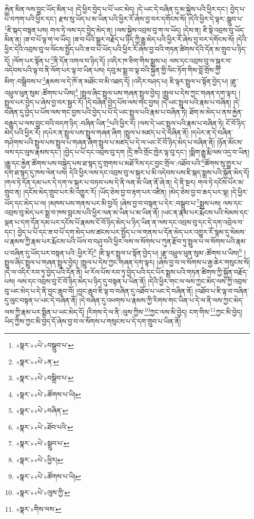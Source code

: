 རྐྱེན་མིན་ལས་བྱུང་ཡོད་མིན་པ། །དེ་ཕྱིར་བྱེད་པ་པོ་ཡང་མེད། །དེ་ཡང་དེ་བཞིན་དུ་མ་སྐྱེས་པའི་ཕྱིར་དང་། བྱེད་པ་པོ་བཀག་པའི་ཕྱིར་དང་། རྫས་སུ་ཡོད་པ་མ་ཡིན་པའི་ཕྱིར་རོ་ཞེས་བྱ་བར་དགོངས་སོ། །དེའི་ཕྱིར་དེ་ལྟར་:སྒྲུབ་པ་\footnote{«སྣར་»«པེ་»བསྒྲུབ་པ་}ཇི་སྐད་བསྟན་པས། གལ་ཏེ་ལས་དང་བྱེད་མེད་ན། །ལས་སྐྱེས་འབྲས་བུ་ག་ལ་ཡོད། །དེས་ན། ཇི་སྟེ་འབྲས་བུ་ཡོད་མིན་ན། །ཟ་བ་པོ་ལྟ་ག་ལ་ཡོད། །ཟ་བ་པོའི་སྒྲར་བརྗོད་པ་ཉིད་ཀྱི་རྒྱུ་མེད་པའི་ཕྱིར་རོ་ཞེས་བྱ་བར་དགོངས་སོ། །དེའི་ཕྱིར་དེའི་འབྲས་བུ་ལ་ལོངས་སྤྱོད་པའི་ཟ་བ་པོ་ཡོད་པའི་ཕྱིར་རོ་ཞེས་བྱ་བའི་གཏན་ཚིགས་དེའི་དོན་མ་གྲུབ་པ་ཉིད་དོ། །ལོག་པར་སྟོན་པ་\footnote{«སྣར་»«པེ་»ན་}ནི་དོན་འགལ་བ་ཉིད་དོ། །འདིར་ཁ་ཅིག་གིས་སྨྲས་པ། ལས་དང་འབྲས་བུ་ལ་སྐུར་བ་འདེབས་པའི་ལྟ་བ་ནི་ལོག་པར་ལྟ་བ་ཡིན་པས། དབུ་མ་སྨྲ་བ་ལྟ་བའི་སྐྱོན་གྱི་ལིང་ཏོག་གིས་བློ་གྲོས་ཀྱི་མིག་:བསྒྲིབས་པ་\footnote{«སྣར་»«པེ་»བསྒྲིབ་པ་}རྣམས་ལ་དེ་ཁོ་ན་མཐོང་བ་མི་འཐད་དོ། །འདིར་བཤད་པ། ཇི་ལྟར་སྤྲུལ་པ་སྟོན་བྱེད་པ། །རྫུ་འཕྲུལ་ཕུན་སུམ་:ཚོགས་པ་ཡིས།\footnote{«སྣར་»«པེ་»ཚོགས་པ་ཡི།} །སྤྲུལ་ཞིང་སྤྲུལ་པས་གཞན་སྤྲུལ་བྱེད། །སྤྲུལ་པ་དེས་ཀྱང་གཞན་དག་ལྟར། །སྤྲུལ་པར་བྱེད་པ་ཞེས་བྱ་བར་སྦྱར་རོ། །དེ་བཞིན་བྱེད་པོས་ལས་གང་བྱས། །དེ་ཡང་སྤྲུལ་པའི་རྣམ་པ་བཞིན། །དེ་བཞིན་དུ་བྱེད་པ་པོས་ལས་གང་བྱས་པའི་བྱེད་པ་པོ་དེ་ཡང་སྤྲུལ་པའི་རྣམ་པ་བཞིན་ཏེ། ཐོག་མ་མེད་པ་ནས་རྐྱེན་བརྒྱུད་པ་ལས་བྱུང་བའི་བདག་ཉིད་:བཞིན་ཡིན་\footnote{«སྣར་»«པེ་»བཞིན་}པའི་ཕྱིར་རོ། །ལས་དེ་ཡང་སྤྲུལ་པའི་རྣམ་པ་བཞིན་ཏེ། ངོ་བོ་ཉིད་མེད་པའི་ཕྱིར་རོ། །དཔེར་ན་སྤྲུལ་པས་སྤྲུལ་གཞན་ཞིག །སྤྲུལ་པ་མཛད་པ་དེ་བཞིན་ནོ། །དཔེར་ན་དེ་བཞིན་གཤེགས་པའི་སྤྲུལ་པས་སྤྲུལ་པ་གཞན་ཞིག་སྤྲུལ་པ་མཛད་པ་དེ་ལ་ཡང་ངོ་བོ་ཉིད་མེད་པ་བཞིན་ནོ། །ཉོན་མོངས་ལས་དང་ལུས་རྣམས་དང་། །བྱེད་པ་པོ་དང་འབྲས་བུ་དག །དྲི་ཟའི་གྲོང་ཁྱེར་ལྟ་བུ་དང་། །སྨིག་རྒྱུ་རྨི་ལམ་འདྲ་བ་ཡིན། །རྒྱུ་དང་རྐྱེན་ཚོགས་པས་བསྐྱེད་པས་ཐ་སྙད་དུ་གྲགས་པ་མཐོ་རིས་དང་བྱང་གྲོལ་:འཐོབ་པའི་\footnote{«སྣར་»«པེ་»ཐོབ་པའི་}ཚོགས་སུ་གྱུར་པ་དག་ཐ་སྙད་དུ་ཁས་ལེན་པས། དེའི་ཕྱིར་ལས་དང་འབྲས་བུ་ལ་སྐུར་པ་མི་འདེབས་པས་ཇི་སྐད་སྨྲས་པའི་སྐྱོན་མེད་དོ། །གལ་ཏེ་དོན་དམ་པར་དེ་དག་ལ་སྐུར་པ་བཏབ་པས་དེ་ནི་ལན་མ་ཡིན་ནོ་ཞེ་ན། དེ་ནི་སྔར། གལ་ཏེ་དངོས་པོར་མ་གྲུབ་ན། །དངོས་མེད་གྲུབ་པར་མི་འགྱུར་རོ། །ཡོད་ཅེས་བྱ་བ་རྟག་པར་འཛིན། །མེད་ཅེས་བྱ་བ་ཆད་པར་ལྟ། །དེ་ཕྱིར་ཡོད་དང་མེད་པ་ལ། །མཁས་པས་གནས་པར་མི་བྱའོ། །ཞེས་བྱ་བ་བསྟན་པ་དེར་:བསྒྲུབ་པ་\footnote{«སྣར་»«པེ་»སྒྲུབ་པ་}སྨྲས་པས། ལས་དང་འབྲས་བུ་མེད་པར་སྨྲ་བ་ཁས་བླངས་པའི་ཕྱིར་ལན་མ་ཡིན་པ་མ་ཡིན་ནོ། །ཡང་ན་རྣམ་པར་རྨོངས་པའི་སེམས་དང་ལྡན་པ་དག་དོན་དམ་པར་དངོས་པོ་རྣམས་ངོ་བོ་ཉིད་མེད་པ་ཉིད་ཡིན་ན་ལས་དང་འབྲས་བུ་དང་དེ་དག་འབྲེལ་བ་དང་། བྱེད་པ་པོ་དང་ཟ་བ་པོ་དག་མེད་པས་ཚངས་པར་སྤྱོད་པ་ལ་གནས་པ་དོན་མེད་པར་འགྱུར་རོ་སྙམ་དུ་སེམས་པ་རྣམས་ཀྱི་རྣམ་པར་རྨོངས་པའི་ཡོལ་བ་བཤུ་བའི་ཕྱིར་ལས་ལ་སོགས་པ་ཀུན་རྫོབ་ཏུ་སྤྲུལ་པ་ལ་སོགས་པའི་རྣམ་པ་བཞིན་དུ་ཡོད་པར་བསྟན་པའི་:ཕྱིར་རོ།\footnote{«སྣར་»«པེ་»ཕྱིར།} །ཇི་ལྟར་སྤྲུལ་པ་སྟོན་བྱེད་པ། །རྫུ་འཕྲུལ་ཕུན་སུམ་:ཚོགས་པ་ཡིས།\footnote{«སྣར་»«པེ་»ཚོགས་པ་ཡི།} །སྤྲུལ་ཞིང་སྤྲུལ་པ་གཞན་སྤྲུལ་བྱེད། །སྤྲུལ་པ་དེས་ཀྱང་གཞན་དག་ལྟར། །ཞེས་བྱ་བ་ལ་སོགས་པ་རྒྱ་ཆེར་གསུངས་སོ། །དེ་ལ་འདིར་རབ་ཏུ་བྱེད་པའི་དོན་ནི། ཕ་རོལ་པོས་རབ་ཏུ་བྱེད་པའི་དང་པོར་སྨྲས་པའི་གཏན་ཚིགས་ཀྱི་སྐྱོན་བརྗོད་པས། ལས་དང་འབྲས་བུ་ངོ་བོ་ཉིད་མེད་པ་ཉིད་དུ་བསྟན་པ་ཡིན་ནོ། །དེའི་ཕྱིར་གང་ལ་ལས་ཀྱང་མེད་ལས་ཀྱི་འབྲས་བུ་ཡང་མེད་པ་དེ་ནི་བྱང་ཆུབ་བོ། །བྱང་ཆུབ་ཇི་ལྟ་བ་བཞིན་དུ་འཐོབ་པ་ཡང་དེ་བཞིན་ནོ། །འཐོབ་པ་ཇི་ལྟ་བ་བཞིན་དུ་ལུང་བསྟན་པ་ཡང་དེ་བཞིན་ནོ། །དེ་བཞིན་དུ་འཕགས་པ་རྣམས་ཀྱི་རིགས་གང་ཡིན་པ་དེ་ལ་ནི་ལས་ཀྱང་མེད་ལས་ཀྱི་རྣམ་པར་སྨིན་པ་ཡང་མེད་དོ། །རིགས་དེ་ལ་ནི་:ལུས་ཀྱིས་\footnote{«སྣར་»«པེ་»ལུས་ཀྱི་}ཀྱང་ལས་མི་བྱེད། ངག་གིས་\footnote{«སྣར་»གིས་ལས་}ཀྱང་མི་བྱེད། ཡིད་ཀྱིས་ཀྱང་མི་བྱེད་དོ་ཞེས་བྱ་བ་ལ་སོགས་པ་གསུངས་པ་དེ་དག་གྲུབ་པ་ཡིན་ནོ། 
